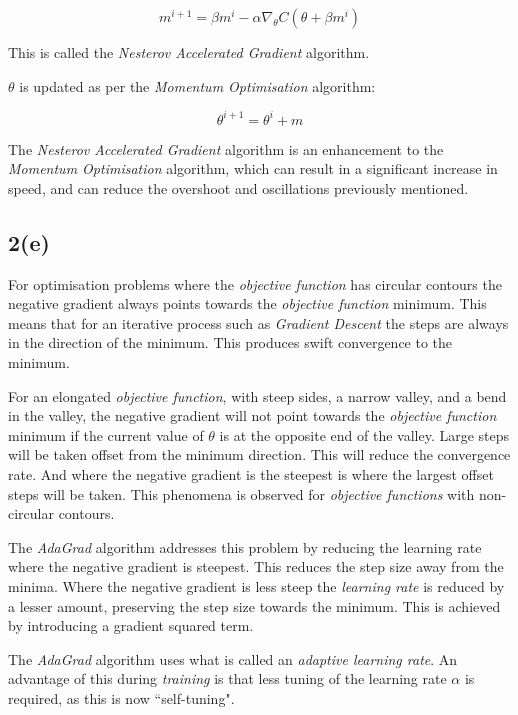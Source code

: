 \documentclass[12pt, a4paper,reqno]{article}
\begin{document}
\begin{equation}
m^{i+1} = \beta m^i - \alpha\nabla_\theta C(\theta + \beta m^i)
\end{equation}
 
This is called the \emph{Nesterov Accelerated Gradient} algorithm.
 
$\theta$ is updated as per the \emph{Momentum Optimisation}  algorithm:
   
\begin{equation}
\theta^{i+1} = \theta^i + m
\end{equation}

The \emph{Nesterov Accelerated Gradient} algorithm is an enhancement to the \emph{Momentum Optimisation} algorithm, which can result in a significant increase in speed, and can reduce the overshoot and oscillations previously mentioned. 

\subsection*{2(e)}

For optimisation problems where the \emph{objective function} has circular contours the negative gradient always points towards the \emph{objective function} minimum. This means that for an iterative process such as \emph{Gradient Descent} the steps are always in the direction of the minimum. This produces swift convergence to the minimum.

For an elongated \emph{objective function}, with steep sides, a narrow valley, and a bend in the valley, the negative gradient will not point towards the \emph{objective function} minimum if the current value of $\theta$ is at the opposite end of the valley. Large steps will be taken offset from the minimum direction. This will reduce the convergence rate. And where the negative gradient is the steepest is where the largest offset steps will be taken. This phenomena is observed for \emph{objective functions} with non-circular contours. 

The \emph{AdaGrad} algorithm addresses this problem by reducing the learning rate where the negative gradient is steepest. This reduces the step size away from the minima. Where the negative gradient is less steep the \emph{learning rate} is reduced by a lesser amount, preserving the step size towards the minimum. This is achieved by introducing a gradient squared term.

The \emph{AdaGrad} algorithm uses what is called an \emph{adaptive learning rate}. An advantage of this during \emph{training} is that less tuning of the learning rate $\alpha$ is required, as this is now ``self-tuning".
\end{document}
